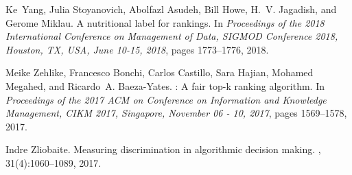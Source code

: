 Ke~Yang, Julia Stoyanovich, Abolfazl Asudeh, Bill Howe, H.~V. Jagadish, and
  Gerome Miklau.
\newblock A nutritional label for rankings.
\newblock In {\em Proceedings of the 2018 International Conference on
  Management of Data, {SIGMOD} Conference 2018, Houston, TX, USA, June 10-15,
  2018}, pages 1773--1776, 2018.

Meike Zehlike, Francesco Bonchi, Carlos Castillo, Sara Hajian, Mohamed Megahed,
  and Ricardo~A. Baeza{-}Yates.
: {A} fair top-k ranking algorithm.
\newblock In {\em Proceedings of the 2017 {ACM} on Conference on Information
  and Knowledge Management, {CIKM} 2017, Singapore, November 06 - 10, 2017},
  pages 1569--1578, 2017.

Indre Zliobaite.
\newblock Measuring discrimination in algorithmic decision making.
, 31(4):1060--1089, 2017.

